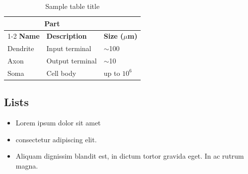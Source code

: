 \documentclass{article}
\begin{document}
\begin{table}
	\caption{Sample table title}
	\centering
	\begin{tabular}{lll}
		\toprule
		\multicolumn{2}{c}{Part}                   \\
		\cmidrule(r){1-2}
		\rowcolor{paperForest}
		\textcolor{paperBackground}{\bfseries Name}
		         & \textcolor{paperBackground}{\bfseries Description}
		                           & \textcolor{paperBackground}{\bfseries Size ($\mu$m)} \\
		\midrule
		\rowcolor{paperSurface}
		Dendrite & Input terminal  & $\sim$100     \\
		\rowcolor{paperMatcha!12!paperBackground}
		Axon     & Output terminal & $\sim$10      \\
		\rowcolor{paperSurface}
		Soma     & Cell body       & up to $10^6$  \\
		\bottomrule
	\end{tabular}
	\label{tab:table}
\end{table}

\subsection{Lists}
\begin{itemize}
	\item Lorem ipsum dolor sit amet
	\item consectetur adipiscing elit.
	\item Aliquam dignissim blandit est, in dictum tortor gravida eget. In ac rutrum magna.
\end{itemize}









\end{document}
